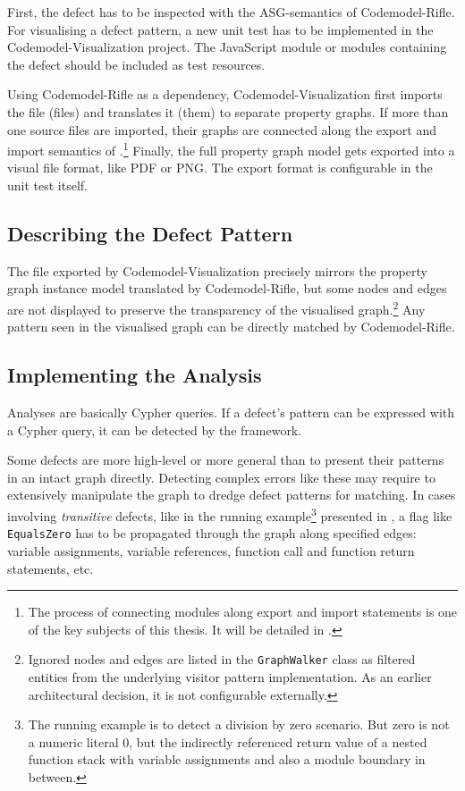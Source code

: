 First, the defect has to be inspected with the ASG-semantics of Codemodel-Rifle. For visualising a defect pattern, a new unit test has to be implemented in the Codemodel-Visualization project. The JavaScript module or modules containing the defect should be included as test resources.

Using Codemodel-Rifle as a dependency, Codemodel-Visualization first imports the file (files) and translates it (them) to separate property graphs. If more than one source files are imported, their graphs are connected along the export and import semantics of \es.\footnote{The process of connecting \es modules along export and import statements is one of the key subjects of this thesis. It will be detailed in .} Finally, the full property graph model gets exported into a visual file format, like PDF or PNG. The export format is configurable in the unit test itself.


\subsection{Describing the Defect Pattern}

The file exported by Codemodel-Visualization precisely mirrors the property graph instance model translated by Codemodel-Rifle, but some nodes and edges are not displayed to preserve the transparency of the visualised graph.\footnote{Ignored nodes and edges are listed in the \lstinline{GraphWalker} class as filtered entities from the underlying visitor pattern implementation. As an earlier architectural decision, it is not configurable externally.} Any pattern seen in the visualised graph can be directly matched by Codemodel-Rifle.


\subsection{Implementing the Analysis}
\label{subsection:implementing-analyses}

Analyses are basically Cypher queries. If a defect's pattern can be expressed with a Cypher query, it can be detected by the framework.

Some defects are more high-level or more general than to present their patterns in an intact graph directly. Detecting complex errors like these may require to extensively manipulate the graph to dredge defect patterns for matching. In cases involving \emph{transitive} defects, like in the running example\footnote{The running example is to detect a division by zero scenario. But zero is not a numeric literal $0$, but the indirectly referenced return value of a nested function stack with variable assignments and also a module boundary in between.} presented in , a flag like \lstinline{EqualsZero} has to be propagated through the graph along specified edges: variable assignments, variable references, function call and function return statements, etc.

